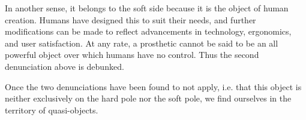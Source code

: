 \documentclass[a4paper]{article}
\begin{document}
\begin{appendices}
In another sense, it belongs to the soft side because it is the object of
human creation. Humans have designed this to suit their needs, and further
modifications can be made to reflect advancements in technology, ergonomics,
and user satisfaction. At any rate, a prosthetic cannot be said to be an all
powerful object over which humans have no control. Thus the second
denunciation above is debunked.

Once the two denunciations have been found to not apply, i.e. that this object
is neither exclusively on the hard pole nor the soft pole, we find ourselves
in the territory of quasi-objects.

\end{appendices}






\cleardoublepage


%
%

\end{document}
